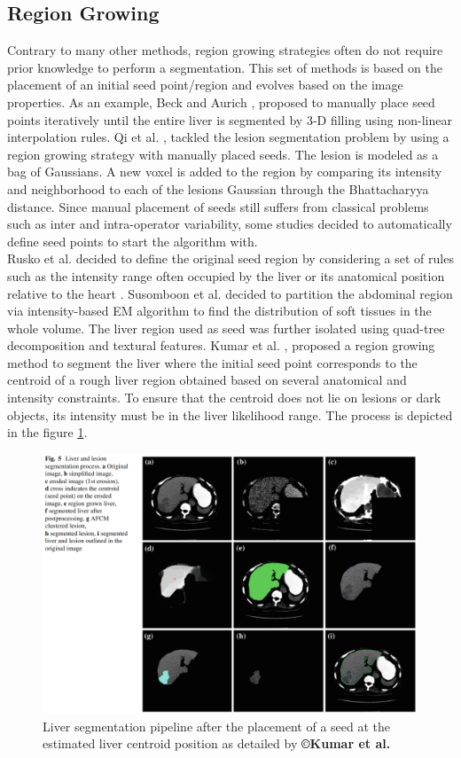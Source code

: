 \documentclass[]{article}
\begin{document}
	\subsection*{Region Growing}
	
	Contrary to many other methods, region growing strategies often do not
	require prior knowledge to perform a segmentation. This set of methods
	is based on the placement of an initial seed point/region and evolves
	based on the image properties. As an example, Beck and Aurich \cite{Beck2007}, proposed to manually place seed points iteratively
	until the entire liver is segmented by 3-D filling using non-linear
	interpolation rules.
	Qi et al. \cite{Qi2008}, tackled the lesion segmentation problem by using a region
	growing strategy with manually placed seeds. The lesion is modeled as a
	bag of Gaussians. A new voxel is added to the region by comparing its
	intensity and neighborhood to each of the lesions Gaussian through the
	Bhattacharyya distance.
	Since manual placement of seeds still suffers from classical problems
	such as inter and intra-operator variability, some studies decided to
	automatically define seed points to start the algorithm with.\\
	Rusko et al. 
	decided to define the original seed region by considering a set of rules
	such as the intensity range often occupied by the liver or its
	anatomical position relative to the heart \cite{Rusko2007, Rusko2009}.
	Susomboon et al. \cite{Susomboon2007} decided to partition the abdominal region via intensity-based
	EM algorithm to find the distribution of soft tissues in the whole
	volume. The liver region used as seed was further isolated using
	quad-tree decomposition and textural features.
	Kumar et al. \cite{Kumar2013}, proposed a region growing method to segment the liver where the
	initial seed point corresponds to the centroid of a rough liver region
	obtained based on several anatomical and intensity constraints. To
	ensure that the centroid does not lie on lesions or dark objects, its
	intensity must be in the liver likelihood range. The process is depicted
	in the figure \ref{Kumar2013_Fig5}.
	
	\begin{figure}[ht!]
		\centering
		\includegraphics[width=0.7\linewidth]{images/image19}
		\caption{Liver segmentation pipeline after the placement of a seed at the estimated liver centroid position as detailed by \textbf{©Kumar et al.} \cite{Kumar2013}}
		\label{Kumar2013_Fig5}
	\end{figure}
	
\end{document}
